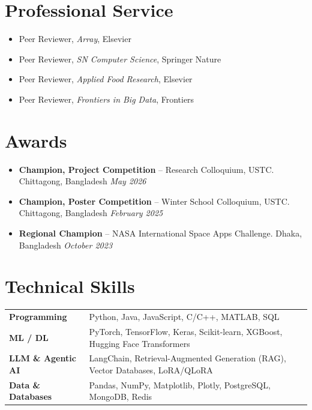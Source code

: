 \documentclass[10pt]{article}
\begin{document}
\section{Professional Service}
\begin{itemize}
    \item Peer Reviewer, \textit{Array}, Elsevier
    \item Peer Reviewer, \textit{SN Computer Science}, Springer Nature
    \item Peer Reviewer, \textit{Applied Food Research}, Elsevier
    \item Peer Reviewer, \textit{Frontiers in Big Data}, Frontiers
\end{itemize}

\section{Awards}
\begin{itemize}
  \item \textbf{Champion, Project Competition} -- Research Colloquium, USTC. Chittagong, Bangladesh \hfill \textit{May 2026}
  \item \textbf{Champion, Poster Competition} -- Winter School Colloquium, USTC. Chittagong, Bangladesh \hfill \textit{February 2025}
  \item \textbf{Regional Champion} -- NASA International Space Apps Challenge. Dhaka, Bangladesh \hfill \textit{October 2023}
\end{itemize}

\section{Technical Skills}
\begin{tabularx}{\linewidth}{@{}l X@{}}
  \textbf{Programming} & Python, Java, JavaScript, C/C++, MATLAB, SQL \\[2pt]
  \textbf{ML / DL} & PyTorch, TensorFlow, Keras, Scikit-learn, XGBoost, Hugging Face Transformers \\[2pt]
  \textbf{LLM \& Agentic AI} & LangChain, Retrieval-Augmented Generation (RAG), Vector Databases, LoRA/QLoRA \\[2pt]
  \textbf{Data \& Databases} & Pandas, NumPy, Matplotlib, Plotly, PostgreSQL, MongoDB, Redis \\
\end{tabularx}
\end{document}
